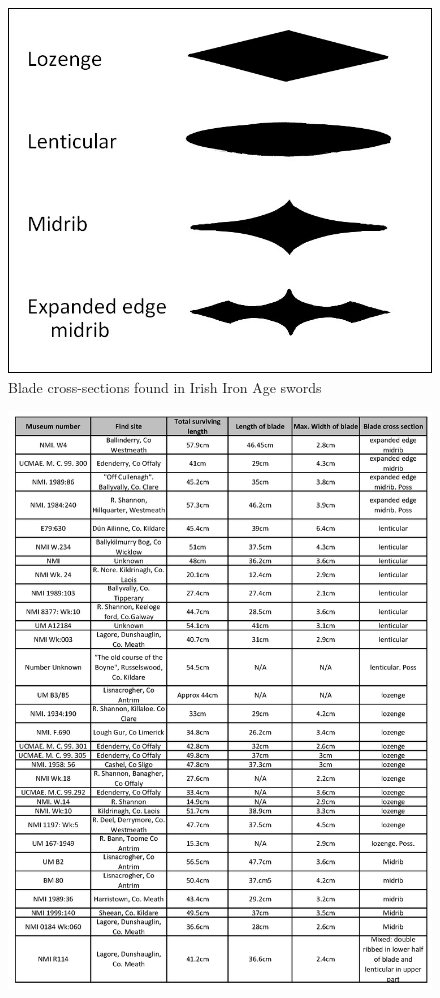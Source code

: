 \begin{figure}
\includegraphics[width=\linewidth]{figures/Hughes_Sword_fig06.jpg} 
\caption{Blade cross-sections found in Irish Iron Age swords }
\label{hughes_fig6}
\end{figure}

\begin{figure}%
\includegraphics[width=\linewidth]{figures/Hughes_Sword_tab01.jpg} 
\label{tab1}
\end{figure}

